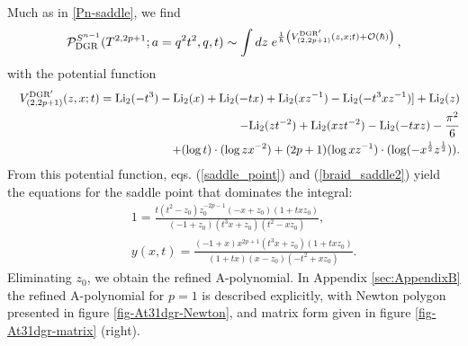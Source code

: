 \documentclass[hyper,letterpaper]{JHEP3}
\newcommand{\be}{\begin{equation}}
\newcommand{\ee}{\end{equation}}
\renewcommand{\P}{{\cal P}}
\begin{document}
Much as in \eqref{Pn-saddle}, we find
\be
\P_{\text{DGR}}^{S^{n-1}}(T^{2,2p+1};a=q^2 t^2,q,t)
\sim \int dz\; e^{\frac{1}{\hbar}\left(V_{(2,2p+1)}^{\text{DGR}'}(z,x;t)
+{\cal O}(\hbar)\right)} \,,
\ee
with the potential function
\begin{eqnarray}
&&V_{(2,2p+1)}^{\text{DGR}'}(z,x;t)= {\rm Li}_2(-t^3) - {\rm Li}_2(x) + {\rm Li}_2(-t x) +
  {\rm Li}_2(xz^{-1}) -  {\rm Li}_2(-t^3 xz^{-1})] + {\rm Li}_2(z)
\nonumber \\
&&\quad\quad\quad\quad\quad\quad\quad
-
 {\rm Li}_2(zt^{-2}) +  {\rm Li}_2(x zt^{-2}) - {\rm Li}_2(-t x z)-\frac{\pi^2}{6}
\nonumber \\
&&\quad\quad\quad\quad\quad\quad\quad
+  (\log t)\cdot (\log zx^{-2}) +
 (2 p+1)(\log xz^{-1})\cdot (\log (-x^{\frac{1}{2}}z^{\frac{1}{2}})).
\end{eqnarray}
{}From this potential function, eqs. (\ref{saddle_point}) and (\ref{braid_saddle2}) yield
the equations for the saddle point that dominates the integral:
\begin{eqnarray}
&&1=\frac{t (t^2 - z_0) z_0^{- 2 p-1} (-x + z_0) (1 + t x z_0)}{(-1 + z_0) (t^3 x +
 z_0) (t^2 - x z_0)},
\nonumber \\
&&y(x,t)=\frac{(-1 + x) x^{2 p+1} (t^3 x + z_0) (1 + t x z_0)}{(1 + t x) (x - z_0) (-t^2 + x z_0)}.
\label{Saddle_DGR1}
\end{eqnarray}
Eliminating $z_0$, we obtain the refined A-polynomial.
In Appendix \ref{sec:AppendixB} the refined A-polynomial for $p=1$ is described explicitly,
with Newton polygon presented in figure \ref{fig-At31dgr-Newton}, and matrix form given in figure \ref{fig-At31dgr-matrix} (right).
\end{document}
